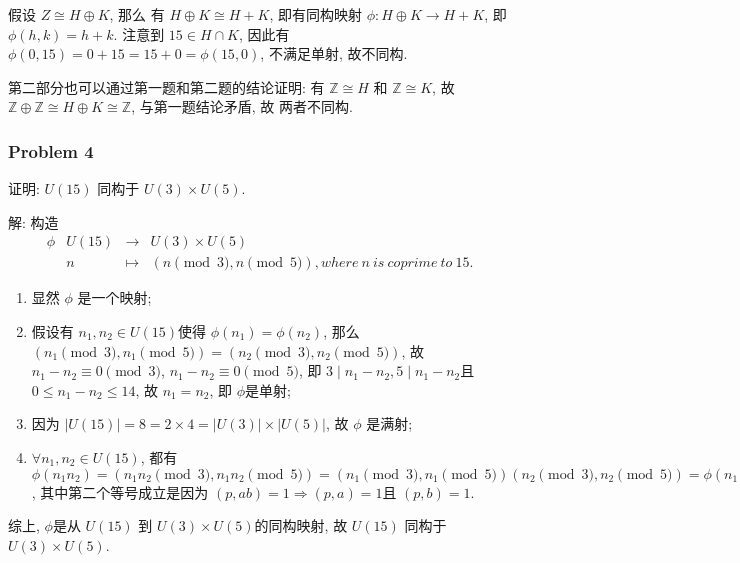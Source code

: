 \documentclass[a4paper,12pt]{ctexart}
\newcommand{\Z}{\mathbb{Z}}
\begin{document}
    假设 $ Z\cong H\oplus K $, 那么 有 $ H\oplus K\cong H+K $, 即有同构映射 $ \phi: H\oplus K\rightarrow H+K $, 
    即 $ \phi(h,k)=h+k $. 注意到 $ 15\in H\cap K $, 因此有 $ \phi(0,15)=0+15=15+0=\phi(15,0) $, 不满足单射, 故不同构.

    第二部分也可以通过第一题和第二题的结论证明: 有 $ \Z\cong H $ 和 $ \Z\cong K $, 故
    $ \Z\oplus\Z\cong H\oplus K\cong\Z $, 与第一题结论矛盾, 故 两者不同构.

\subsubsection*{Problem 4}
    证明: $ U(15) $ 同构于 $ U(3)\times U(5) $.

    解: 构造
    \[\begin{array}{crcl}
      \phi&U(15)&\longrightarrow&U(3)\times U(5)\\
          & n   &\longmapsto    &(n\pmod{3},n\pmod{5}), where~n~is~coprime~to~15.
    \end{array}\]
    \begin{enumerate}[label=(\arabic{*})]
      \item 显然  $ \phi $ 是一个映射;
      \item 假设有 $ n_1,n_2\in U(15) $使得 $ \phi(n_1)=\phi(n_2) $, 那么 $ (n_1\pmod{3},n_1\pmod{5})=(n_2\pmod{3},n_2\pmod{5}) $, 故 $ n_1-n_2\equiv 0\pmod{3} $, $ n_1-n_2\equiv 0\pmod{5} $,  即 $ 3\mid n_1-n_2,5\mid n_1-n_2 $且
      $ 0\le n_1-n_2\le 14 $, 故 $ n_1=n_2 $, 即 $ \phi $是单射;
      \item 因为 $ |U(15)|=8=2\times 4=|U(3)|\times|U(5)| $, 故 $ \phi $ 是满射;
      \item $ \forall n_1,n_2\in U(15) $, 都有 $ \phi(n_1n_2)=(n_1n_2\pmod{3},n_1n_2\pmod{5})=(n_1\pmod{3},n_1\pmod{5})(n_2\pmod{3},n_2\pmod{5})=\phi(n_1)\phi(n_2) $, 其中第二个等号成立是因为 $ (p,ab)=1\Rightarrow (p,a)=1 $且 $ (p,b)=1 $.
    \end{enumerate}
    综上, $ \phi $是从  $ U(15) $ 到 $ U(3)\times U(5) $的同构映射, 故 $ U(15) $ 同构于 $ U(3)\times U(5) $.
\end{document}
